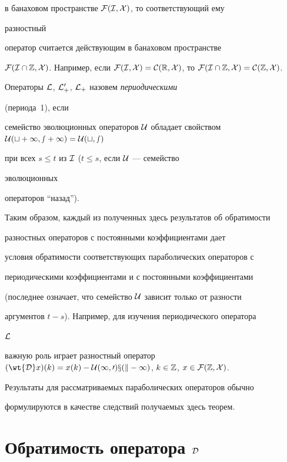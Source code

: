 в банаховом пространстве $\cal F(\cal I,X)$, то соответствующий ему 


разностный 


оператор считается действующим в банаховом пространстве 


$\cal F(\cal I\cap\Bbb Z,X)$. Например, если $\cal F(\cal I,X)=C(\Bbb 


R,X)$, то $\cal F(\cal I\cap\Bbb Z,X)=C(\Bbb Z,X)$. 


 


Операторы $\cal L$, $\cal L^0_+$, $\cal L_+$ назовем {\it периодическими} 


(периода~1), если 


семейство эволюционных операторов $\cal U$ обладает свойством $\cal 


U(t+1,s+1)=\cal U(t,s)$ 


при всех $s\le t$ из $\cal I$ ($t\le s$, если $\cal U$ --- семейство 


эволюционных 


операторов ``назад''). 


 


Таким образом, каждый из полученных здесь результатов об обратимости 


разностных операторов с постоянными коэффициентами дает 


условия обратимости соответствующих параболических операторов с 


периодическими коэффициентами и с постоянными коэффициентами 


(последнее означает, что семейство $\cal U$ зависит только от разности 


аргументов $t-s$). Например, для изучения периодического оператора 


$\cal L$ 


важную роль играет разностный оператор $(\wt{\cal D}x)(k)=x(k)-\cal 


U(1,0)x(k-1)$, $k\in\Bbb Z$, $x\in\cal F(\Bbb Z,X)$. 


 


Результаты для рассматриваемых параболических операторов обычно 


формулируются в качестве следствий получаемых здесь теорем. 


 


\section{Обратимость оператора $\cal D$} 


